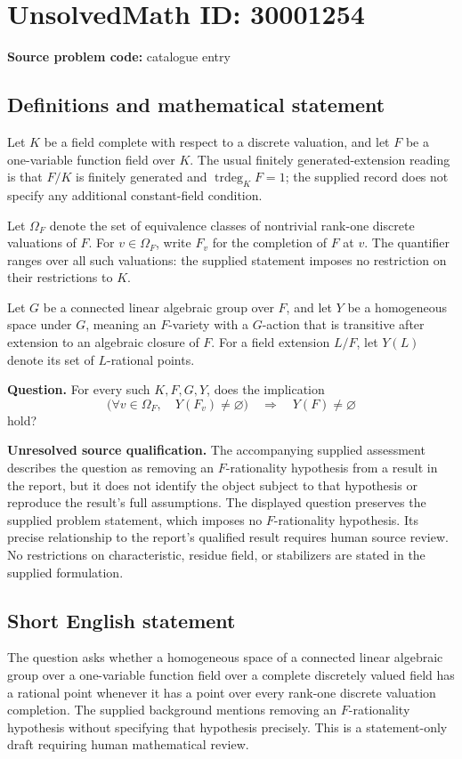 \documentclass[11pt]{article}
\begin{document}
\section*{UnsolvedMath ID: 30001254}
\textbf{Source problem code:} catalogue entry
\subsection{Definitions and mathematical statement}
Let \(K\) be a field complete with respect to a discrete valuation, and let \(F\) be a one-variable function field over \(K\). The usual finitely generated-extension reading is that \(F/K\) is finitely generated and \(\operatorname{trdeg}_K F=1\); the supplied record does not specify any additional constant-field condition.

Let \(\Omega_F\) denote the set of equivalence classes of nontrivial rank-one discrete valuations of \(F\). For \(v\in\Omega_F\), write \(F_v\) for the completion of \(F\) at \(v\). The quantifier ranges over all such valuations: the supplied statement imposes no restriction on their restrictions to \(K\).

Let \(G\) be a connected linear algebraic group over \(F\), and let \(Y\) be a homogeneous space under \(G\), meaning an \(F\)-variety with a \(G\)-action that is transitive after extension to an algebraic closure of \(F\). For a field extension \(L/F\), let \(Y(L)\) denote its set of \(L\)-rational points.

\textbf{Question.} For every such \(K,F,G,Y\), does the implication
\[
\bigl(\forall v\in\Omega_F,\quad Y(F_v)\ne\varnothing\bigr)
\quad\Longrightarrow\quad
Y(F)\ne\varnothing
\]
hold?

\textbf{Unresolved source qualification.} The accompanying supplied assessment describes the question as removing an \(F\)-rationality hypothesis from a result in the report, but it does not identify the object subject to that hypothesis or reproduce the result's full assumptions. The displayed question preserves the supplied problem statement, which imposes no \(F\)-rationality hypothesis. Its precise relationship to the report's qualified result requires human source review. No restrictions on characteristic, residue field, or stabilizers are stated in the supplied formulation.
\subsection{Short English statement}
The question asks whether a homogeneous space of a connected linear algebraic group over a one-variable function field over a complete discretely valued field has a rational point whenever it has a point over every rank-one discrete valuation completion. The supplied background mentions removing an \(F\)-rationality hypothesis without specifying that hypothesis precisely. This is a statement-only draft requiring human mathematical review.
\end{document}
